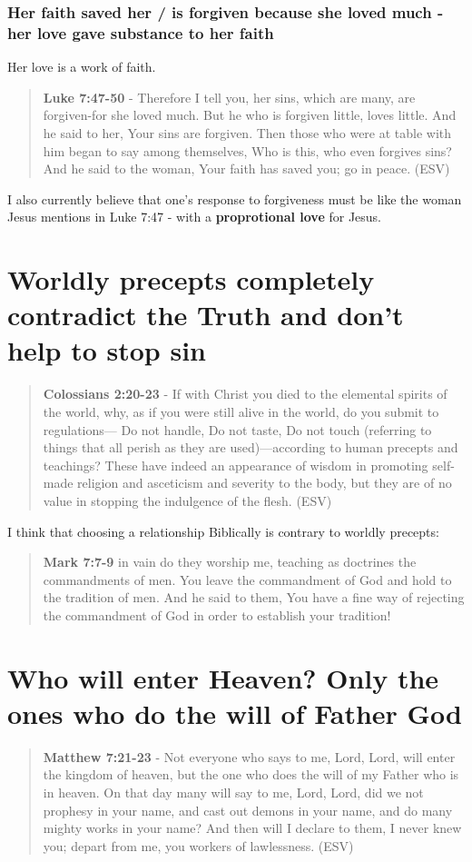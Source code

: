 \documentclass[11pt]{article}
\begin{document}
\subsubsection{Her faith saved her / is forgiven because she loved much - her love gave substance to her faith}
\label{sec:org5a4e0e9}
Her love is a work of faith.

\begin{quote}
\textbf{Luke 7:47-50} - Therefore I tell you, her sins, which are many, are forgiven-for she loved much. But he who is forgiven little, loves little. And he said to her, Your sins are forgiven. Then those who were at table with him began to say among themselves, Who is this, who even forgives sins? And he said to the woman, Your faith has saved you; go in peace. (ESV)
\end{quote}

I also currently believe that one's response to forgiveness must be like the woman Jesus mentions in Luke 7:47 - with a \textbf{proprotional love} for Jesus.

\section{Worldly precepts completely contradict the Truth and don't help to stop sin}
\label{sec:org8e5e665}
\begin{quote}
\textbf{Colossians 2:20-23} - If with Christ you died to the elemental spirits of the world, why, as if you were still alive in the world, do you submit to regulations— Do not handle, Do not taste, Do not touch (referring to things that all perish as they are used)—according to human precepts and teachings? These have indeed an appearance of wisdom in promoting self-made religion and asceticism and severity to the body, but they are of no value in stopping the indulgence of the flesh. (ESV)
\end{quote}

I think that choosing a relationship Biblically is contrary to worldly precepts:

\begin{quote}
\textbf{Mark 7:7-9} in vain do they worship me, teaching as doctrines the commandments of men.  You leave the commandment of God and hold to the tradition of men.  And he said to them, You have a fine way of rejecting the commandment of God in order to establish your tradition!
\end{quote}

\section{Who will enter Heaven? Only the ones who do the will of Father God}
\label{sec:org0433b55}
\begin{quote}
\textbf{Matthew 7:21-23} - Not everyone who says to me, Lord, Lord, will enter the kingdom of heaven, but the one who does the will of my Father who is in heaven. On that day many will say to me, Lord, Lord, did we not prophesy in your name, and cast out demons in your name, and do many mighty works in your name? And then will I declare to them, I never knew you; depart from me, you workers of lawlessness. (ESV)
\end{quote}
\end{document}
